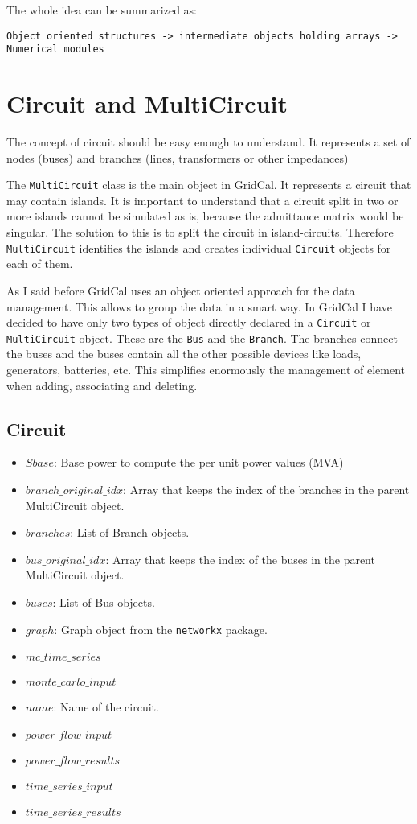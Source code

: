 \documentclass[11pt,fleqn]{book} %
\begin{document}
The whole idea can be summarized as:

\begin{verbatim}
Object oriented structures -> intermediate objects holding arrays -> Numerical modules
\end{verbatim}




\section{Circuit and MultiCircuit}

The concept of circuit should be easy enough to understand. It represents a set of nodes (buses) and branches (lines, transformers or other impedances)


The \verb|MultiCircuit| class is the main object in GridCal. It represents a circuit that may contain islands. It is important to understand that a circuit split in two or more islands cannot be simulated as is, because the admittance matrix would be singular. The solution to this is to split the circuit in island-circuits. Therefore \verb|MultiCircuit| identifies the islands and creates individual \verb|Circuit| objects for each of them.

As I said before GridCal uses an object oriented approach for the data management. This allows to group the data in a smart way. In GridCal I have decided to have only two types of object directly declared in a \verb|Circuit| or \verb|MultiCircuit| object. These are the \verb|Bus| and the \verb|Branch|. The branches connect the buses and the buses contain all the other possible devices like loads, generators, batteries, etc. This simplifies enormously the management of element when adding, associating and deleting.

\subsection{Circuit}

\begin{itemize}
	\item $Sbase$: Base power to compute the per unit power values (MVA)
	\item $branch\_original\_idx$: Array that keeps the index of the branches in the parent MultiCircuit object.
	\item $branches$: List of Branch objects.
	\item $bus\_original\_idx$: Array that keeps the index of the buses in the parent MultiCircuit object.
	\item $buses$: List of Bus objects.
	\item $graph$: Graph object from the \verb|networkx| package.
	\item $mc\_time\_series$
	\item $monte\_carlo\_input$
	\item $name$: Name of the circuit.
	\item $power\_flow\_input$
	\item $power\_flow\_results$
	\item $time\_series\_input$
	\item $time\_series\_results$
\end{itemize}
\end{document}
